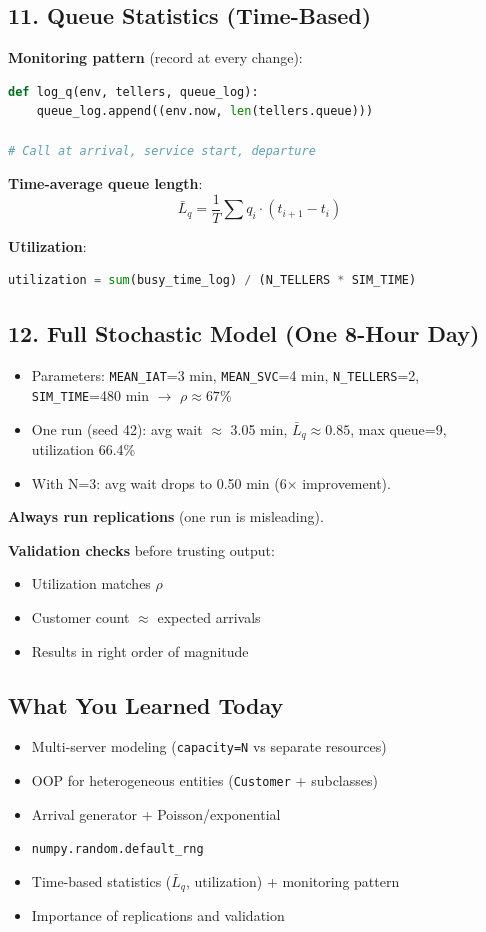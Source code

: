 \documentclass[11pt]{article}
\begin{document}
\subsection*{11. Queue Statistics (Time-Based)}
\textbf{Monitoring pattern} (record at every change):
\begin{lstlisting}[language=Python]
def log_q(env, tellers, queue_log):
    queue_log.append((env.now, len(tellers.queue)))

# Call at arrival, service start, departure
\end{lstlisting}

\textbf{Time-average queue length}:
\[
\bar{L}_q = \frac{1}{T} \sum q_i \cdot (t_{i+1} - t_i)
\]

\textbf{Utilization}:
\begin{lstlisting}[language=Python]
utilization = sum(busy_time_log) / (N_TELLERS * SIM_TIME)
\end{lstlisting}

\subsection*{12. Full Stochastic Model (One 8-Hour Day)}
\begin{itemize}[leftmargin=*]
\item Parameters: \texttt{MEAN\_IAT}=3 min, \texttt{MEAN\_SVC}=4 min, \texttt{N\_TELLERS}=2, \texttt{SIM\_TIME}=480 min $\rightarrow$ \(\rho \approx 67\%\)
\item One run (seed 42): avg wait $\approx$ 3.05 min, \(\bar{L}_q \approx 0.85\), max queue=9, utilization 66.4\%
\item With N=3: avg wait drops to 0.50 min (6$\times$ improvement).
\end{itemize}

\textbf{Always run replications} (one run is misleading).

\textbf{Validation checks} before trusting output:
\begin{itemize}[leftmargin=*]
\item Utilization matches \(\rho\)
\item Customer count $\approx$ expected arrivals
\item Results in right order of magnitude
\end{itemize}

\subsection*{What You Learned Today}
\begin{itemize}[leftmargin=*]
\item Multi-server modeling (\texttt{capacity=N} vs separate resources)
\item OOP for heterogeneous entities (\texttt{Customer} + subclasses)
\item Arrival generator + Poisson/exponential
\item \texttt{numpy.random.default\_rng}
\item Time-based statistics ($\bar{L}_q$, utilization) + monitoring pattern
\item Importance of replications and validation
\end{itemize}
\end{document}
